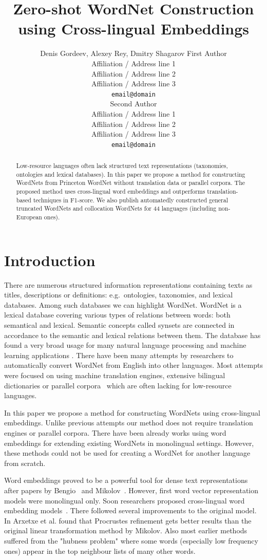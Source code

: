 \documentclass[11pt,a4paper]{article}
\title{Zero-shot WordNet Construction using Cross-lingual Embeddings}
\author{Denis Gordeev, Alexey Rey, Dmitry Shagarov
	First Author \\
  Affiliation / Address line 1 \\
  Affiliation / Address line 2 \\
  Affiliation / Address line 3 \\
  \texttt{email@domain} \\\And
  Second Author \\
  Affiliation / Address line 1 \\
  Affiliation / Address line 2 \\
  Affiliation / Address line 3 \\
  \texttt{email@domain} \\}
\date{}
\begin{document}
\maketitle
\begin{abstract}
Low-resource languages often lack structured text representations (taxonomies, ontologies and lexical databases). In this paper we propose a method for constructing WordNets from Princeton WordNet without translation data or parallel corpora. The proposed method uses cross-lingual word embeddings and outperforms translation-based techniques in F1-score. We also publish automatedly constructed general truncated WordNets and collocation WordNets for 44 languages (including non-European ones).
\end{abstract}

\section{Introduction}

There are numerous structured information representations containing texts as titles, descriptions or definitions: e.g.\ ontologies, taxonomies, and lexical databases. Among such databases we can highlight WordNet\cite{wordnet}. WordNet is a lexical database covering various types of relations between words: both semantical and lexical. Semantic concepts called synsets are connected in accordance to the semantic and lexical relations between them. The database has found a very broad usage for many natural language processing and machine learning applications \cite{kutuzovgraphwordnet,mao-semeval}.
There have been many attempts by researchers to automatically convert WordNet from English into other languages. Most attempts were focused on using machine translation engines, extensive bilingual dictionaries or parallel corpora~\cite{Khodak2017,NEALE18.1030} which are often lacking for low-resource languages.

In this paper we propose a method for constructing WordNets using cross-lingual embeddings. Unlike previous attempts our method does not require translation engines or parallel corpora. There have been already works using word embeddings for extending existing WordNets \cite{sand2017wordnet,tarouti} in monolingual settings. However, these methods could not be used for creating a WordNet for another language from scratch.

Word embeddings proved to be a powerful tool for dense text representations after papers by Bengio~\cite{bengio} and Mikolov~\cite{mikolov-representations-2013}. However, first word vector representation models were monolingual only. Soon researchers proposed cross-lingual word embedding models~\cite{mikolov-parallel}. There followed several improvements to the original model. In \citeyear{artetxe2016learning} Arxetxe et al. found that Procrustes refinement gets better results than the original linear transformation method by Mikolov. Also most earlier methods suffered from the "hubness problem" where some words (especially low frequency ones) appear in the top neighbour lists of many other words.
\end{document}
